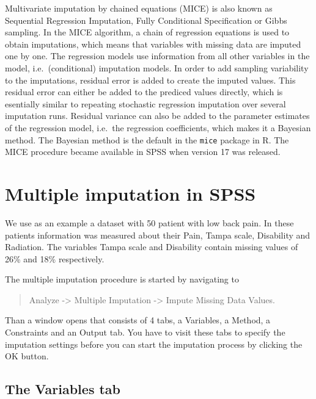 \documentclass[
]{book}
\begin{document}
Multivariate imputation by chained equations (MICE) \citep{VanBuuren2018} is also known as Sequential Regression Imputation, Fully Conditional Specification or Gibbs sampling. In the MICE algorithm, a chain of regression equations is used to obtain imputations, which means that variables with missing data are imputed one by one. The regression models use information from all other variables in the model, i.e.~(conditional) imputation models. In order to add sampling variability to the imputations, residual error is added to create the imputed values. This residual error can either be added to the prediced values directly, which is esentially similar to repeating stochastic regression imputation over several imputation runs. Residual variance can also be added to the parameter estimates of the regression model, i.e.~the regression coefficients, which makes it a Bayesian method. The Bayesian method is the default in the \texttt{mice} package in R. The MICE procedure became available in SPSS when version 17 was released.

\hypertarget{multiple-imputation-in-spss}{%
\section{Multiple imputation in SPSS}\label{multiple-imputation-in-spss}}

We use as an example a dataset with 50 patient with low back pain. In these patients information was measured about their Pain, Tampa scale, Disability and Radiation. The variables Tampa scale and Disability contain missing values of 26\% and 18\% respectively.

The multiple imputation procedure is started by navigating to

\begin{quote}
Analyze -\textgreater{} Multiple Imputation -\textgreater{} Impute Missing Data Values.
\end{quote}

Than a window opens that consists of 4 tabs, a Variables, a Method, a Constraints and an Output tab. You have to visit these tabs to specify the imputation settings before you can start the imputation process by clicking the OK button.

\hypertarget{the-variables-tab}{%
\subsection{The Variables tab}\label{the-variables-tab}}
\end{document}
